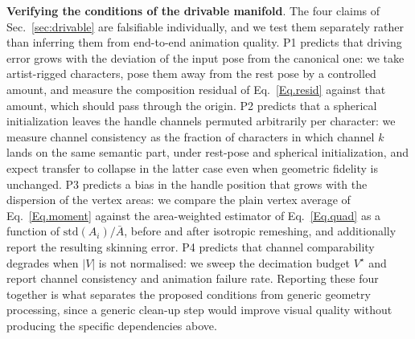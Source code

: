 \documentclass[lettersize,journal]{IEEEtran}
\begin{document}
\textbf{Verifying the conditions of the drivable manifold}. The four claims of
Sec.~\ref{sec:drivable} are falsifiable individually, and we test them separately rather than
inferring them from end-to-end animation quality.
P1 predicts that driving error grows with the deviation of the input pose from the canonical
one: we take artist-rigged characters, pose them away from the rest pose by a controlled
amount, and measure the composition residual of Eq.~\ref{Eq.resid} against that amount, which
should pass through the origin.
P2 predicts that a spherical initialization leaves the handle channels permuted arbitrarily
per character: we measure channel consistency as the fraction of characters in which channel
$k$ lands on the same semantic part, under rest-pose and spherical initialization, and expect
transfer to collapse in the latter case even when geometric fidelity is unchanged.
P3 predicts a bias in the handle position that grows with the dispersion of the vertex areas:
we compare the plain vertex average of Eq.~\ref{Eq.moment} against the area-weighted estimator
of Eq.~\ref{Eq.quad} as a function of $\mathrm{std}(A_{i})/\bar{A}$, before and after isotropic
remeshing, and additionally report the resulting skinning error.
P4 predicts that channel comparability degrades when $|V|$ is not normalised: we sweep the
decimation budget $V^{\star}$ and report channel consistency and animation failure rate.
Reporting these four together is what separates the proposed conditions from generic geometry
processing, since a generic clean-up step would improve visual quality without producing the
specific dependencies above.

\end{document}
